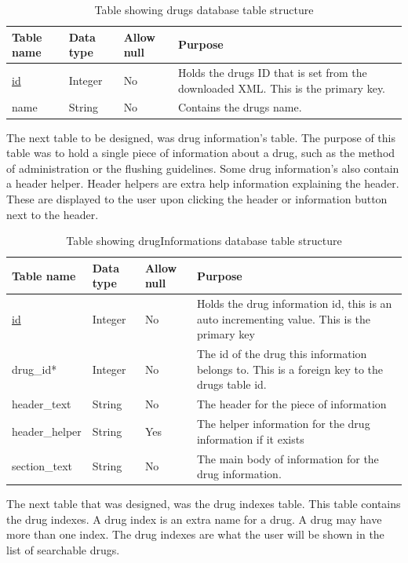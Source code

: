 \begin{center}
\begin{longtable}{|l|l|l|p{8cm}|}
\caption{Table showing drugs database table structure}\tabularnewline
\hline
\textbf{Table name} & \textbf{Data type} & \textbf{Allow null} & \textbf{Purpose}                                                                 \\ \hline
\uline{id}                  & Integer            & No                  & Holds the drugs ID that is set from the downloaded XML. This is the primary key. \\ \hline
name                & String             & No                  & Contains the drugs name.                                                         \\ \hline
\end{longtable}
\end{center}
The next table to be designed, was drug information's table. The purpose of this table was to hold a single piece of information about a drug, such as the method of administration or the flushing guidelines. Some drug information's also contain a header helper. Header helpers are extra help information explaining the header. These are displayed to the user upon clicking the header or information button next to the header.
\newpage
\begin{center}
\begin{longtable}{|l|l|l|p{8cm}|}
\caption{Table showing drugInformations database table structure}\tabularnewline
\hline
\textbf{Table name} & \textbf{Data type} & \textbf{Allow null} & \textbf{Purpose}                                                                             \\ \hline
\uline{id}                  & Integer            & No                  & Holds the drug information id, this is an auto incrementing value. This is the primary key   \\ \hline
drug\_id*           & Integer            & No                  & The id of the drug this information belongs to. This is a foreign key to the drugs table id. \\ \hline
header\_text        & String             & No                  & The header for the piece of information                                                      \\ \hline
header\_helper      & String             & Yes                 & The helper information for the drug information if it exists                                 \\ \hline
section\_text       & String             & No                  & The main body of information for the drug information.                                       \\ \hline
\end{longtable}
\end{center}
The next table that was designed, was the drug indexes table. This table contains the drug indexes. A drug index is an extra name for a drug. A drug may have more than one index. The drug indexes are what the user will be shown in the list of searchable drugs.

